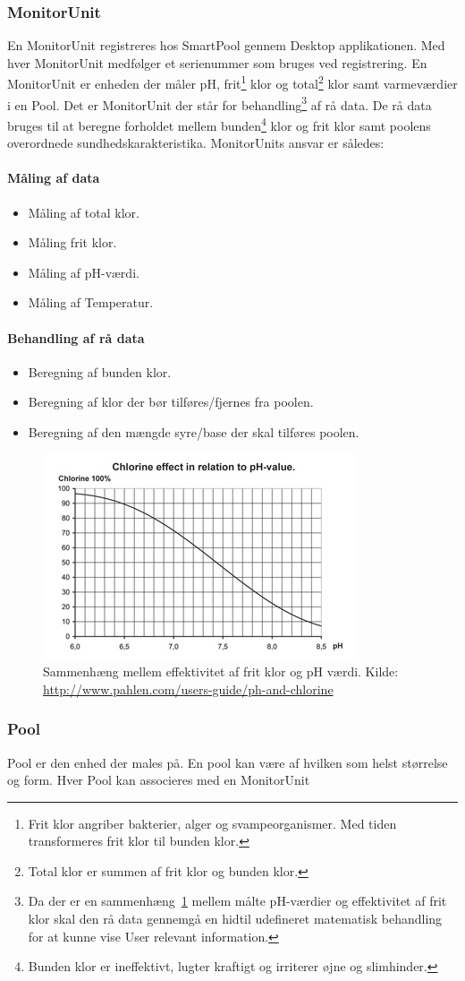 \subsubsection{MonitorUnit}
En MonitorUnit registreres hos SmartPool gennem Desktop applikationen. Med hver MonitorUnit medfølger et serienummer som bruges ved registrering. En MonitorUnit er enheden der måler pH, frit\footnote{Frit klor angriber bakterier, alger og svampeorganismer. Med tiden transformeres frit klor til bunden klor.} klor og total\footnote{Total klor er summen af frit klor og bunden klor.} klor samt varmeværdier i en Pool. Det er MonitorUnit der står for behandling\footnote{Da der er en sammenhæng~\ref{fig:chlorinePh} mellem målte pH-værdier og effektivitet af frit klor skal den rå data gennemgå en hidtil udefineret matematisk behandling for at kunne vise User relevant information.} af rå data. De rå data bruges til at beregne forholdet mellem bunden\footnote{Bunden klor er ineffektivt, lugter kraftigt og irriterer øjne og slimhinder.} klor og frit klor samt poolens overordnede sundhedskarakteristika. MonitorUnits ansvar er således:

\paragraph{Måling af data}
\begin{itemize}
	\item Måling af total klor.
	\item Måling frit klor.
	\item Måling af pH-værdi.
	\item Måling af Temperatur.
\end{itemize}

\paragraph{Behandling af rå data}
\begin{itemize}
	\item Beregning af bunden klor.
	\item Beregning af klor der bør tilføres/fjernes fra poolen.
	\item Beregning af den mængde syre/base der skal tilføres poolen.
\end{itemize}

\begin{figure}
\centering
\includegraphics[width=0.6\linewidth]{figs/chlorinePh.png}
\caption{Sammenhæng mellem effektivitet af frit klor og pH værdi. Kilde: \url{http://www.pahlen.com/users-guide/ph-and-chlorine}}
\label{fig:chlorinePh}
\end{figure}


\subsubsection{Pool}
Pool er den enhed der males på. En pool kan være af hvilken som helst størrelse og form. Hver Pool kan associeres med en MonitorUnit